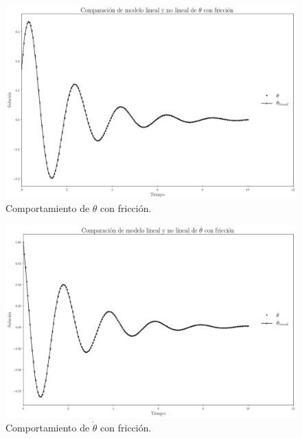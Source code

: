 \documentclass[12pt,letterpaper]{article}
\begin{document}
\begin{figure}
 \centering
 \includegraphics[scale=0.2]{img/sp_plot_theta_theta_linear_friction.png}
 \caption{Comportamiento de $\theta$ con fricción.}
 \label{fig: theta friction}
\end{figure}

\begin{figure}
 \centering
 \includegraphics[scale=0.2]{img/sp_plot_dtheta_dtheta_linear_friction.png}
 \caption{Comportamiento de $\dot{\theta}$ con fricción.}
 \label{fig: dtheta friction}
\end{figure}




\pagebreak
\end{document}
